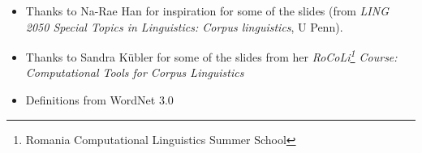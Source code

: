 \documentclass[a4paper,landscape,headrule,footrule,xetex]{foils}
\begin{document}





\begin{itemize}
\item Thanks to Na-Rae Han for 
  inspiration for some of the slides (from  \textit{LING 2050 Special Topics in Linguistics: Corpus linguistics}, U Penn).
\item Thanks to Sandra K\"{u}bler for some of the slides from her 
\textit{RoCoLi\footnote{Romania Computational Linguistics Summer School} Course: Computational Tools for Corpus Linguistics}
\item Definitions from WordNet 3.0
\end{itemize}



\end{document}

